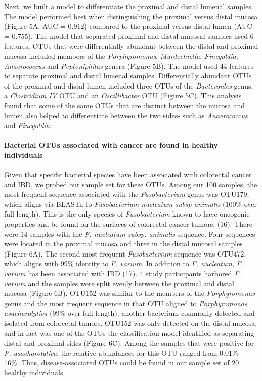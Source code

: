 \documentclass[11pt,]{article}
\let\oldparagraph\paragraph
\renewcommand{\paragraph}[1]{\oldparagraph{#1}\mbox{}}
\begin{document}
Next, we built a model to differentiate the proximal and distal lumenal
samples. The model performed best when distinguishing the proximal
versus distal mucosa (Figure 5A, AUC = 0.912) compared to the proximal
versus distal lumen (AUC = 0.755). The model that separated proximal and
distal mucosal samples used 6 features. OTUs that were differentially
abundant between the distal and proximal mucosa included members of the
\emph{Porphyromonas}, \emph{Murdochiella}, \emph{Finegoldia},
\emph{Anaerococcus} and \emph{Peptoniphilus} genera (Figure 5B). The
model used 44 features to separate proximal and distal lumenal samples.
Differentially abundant OTUs of the proximal and distal lumen included
three OTUs of the \emph{Bacteroides} genus, a \emph{Clostridium IV} OTU
and an \emph{Oscillibacter} OTU (Figure 5C). This analysis found that
some of the same OTUs that are distinct between the mucosa and lumen
also helped to differentiate between the two sides- such as
\emph{Anaerococcus} and \emph{Finegoldia}.

\paragraph{Bacterial OTUs associated with cancer are found in healthy
individuals}\label{bacterial-otus-associated-with-cancer-are-found-in-healthy-individuals}

Given that specific bacterial species have been associated with
colorectal cancer and IBD, we probed our sample set for these OTUs.
Among our 100 samples, the most frequent sequence associated with the
\emph{Fusobacterium} genus was OTU179, which aligns via BLASTn to
\emph{Fusobacterium nucleatum subsp animalis} (100\% over full length).
This is the only species of \emph{Fusobacterium} known to have oncogenic
properties and be found on the surfaces of colorectal cancer tumors.
(16). There were 14 samples with the \emph{F. nucleatum subsp. animalis}
sequence. Four sequences were located in the proximal mucosa and three
in the distal mucosal samples (Figure 6A). The second most frequent
\emph{Fusobacterium} sequence was OTU472, which aligns with 99\%
identity to \emph{F. varium}. In addition to \emph{F. nucleatum},
\emph{F. varium} has been associated with IBD (17). 4 study participants
harbored \emph{F. varium} and the samples were split evenly between the
proximal and distal mucosa (Figure 6B). OTU152 was similar to the
members of the \emph{Porphyromonas} genus and the most frequent sequence
in that OTU aligned to \emph{Porphyromonas asacharolytica} (99\% over
full length), another bacterium commonly detected and isolated from
colorectal tumors. OTU152 was only detected on the distal mucosa, and in
fact was one of the OTUs the classification model identified as
separating distal and proximal sides (Figure 6C). Among the samples that
were positive for \emph{P. asacharolytica}, the relative abundances for
this OTU ranged from 0.01\% - 16\%. Thus, disease-associated OTUs could
be found in our sample set of 20 healthy individuals.
\end{document}
